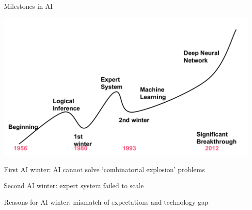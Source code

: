 \documentclass[aspectratio=169,xcolor=dvipsnames,svgnames,x11names,fleqn]{beamer}
\begin{document}
\begin{frame}{Milestones in AI}
\begin{center}
\includegraphics[width=.45\textwidth]{figures/AI_Trend.pdf}
\begin{texample}
First AI winter: AI cannot solve ‘combinatorial explosion’ problems

Second AI winter: expert system failed to scale


Reasons for AI winter: mismatch of expectations and technology gap
\end{texample}

\end{center}

\end{frame}
\end{document}

